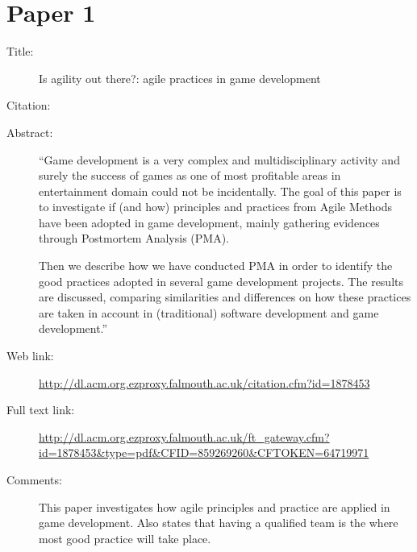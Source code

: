 \documentclass{scrartcl}
\begin{document}
\section*{Paper 1}
\begin{description}
\item[Title:] Is agility out there?: agile practices in game development
\item[Citation:] \cite{petrillo2010agility}
\item[Abstract:] ``Game development is a very complex and multidisciplinary activity and surely the success of games as one of most profitable areas in entertainment domain could not be incidentally. The goal of this paper is to investigate if (and how) principles and practices from Agile Methods have been adopted in game development, mainly gathering evidences through Postmortem Analysis (PMA).

Then we describe how we have conducted PMA in order to identify the good practices adopted in several game development projects. The results are discussed, comparing similarities and differences on how these practices are taken in account in (traditional) software development and game development.''
\item[Web link:] \url{http://dl.acm.org.ezproxy.falmouth.ac.uk/citation.cfm?id=1878453}
\item[Full text link:] \url{http://dl.acm.org.ezproxy.falmouth.ac.uk/ft_gateway.cfm?id=1878453&type=pdf&CFID=859269260&CFTOKEN=64719971}
\item[Comments:] This paper investigates how agile principles and practice are applied in game development. Also states that having a qualified team is the where most good practice will take place.
\end{description}
\end{document}

